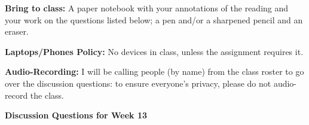 \documentclass[12pt,dvipsnames]{article}
\newcommand*\circled[1]{\tikz[baseline=(char.base)]{%
		\node[shape=circle,fill=blue!20,draw,inner sep=2pt] (char) {#1};}}
\begin{document}
		
		
		
{\bfseries{Bring to class:} } A paper notebook with your annotations of the reading and your work on the questions listed below; a pen and/or a sharpened pencil and an eraser.

{\bfseries{Laptops/Phones Policy:}}  No devices in class, unless the assignment requires it.

{\bfseries{Audio-Recording:}} I will be calling people (by name) from the class roster to go over the discussion questions: to ensure everyone's privacy, please do not audio-record the class.





\begin{center}

{\large{\bfseries{Discussion Questions for Week 13} }}
\end{center}
		\renewcommand{\labelenumi}{(\arabic{enumi})}
\end{document}
